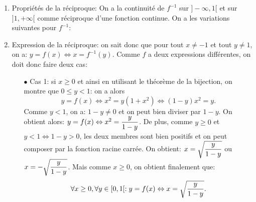 \documentclass[a4paper, 11pt,reqno]{article}
\begin{document}
\begin{correction}
\begin{enumerate}
\begin{itemize}
\begin{itemize}
				            \item[$\star$] $\lim\limits_{x\to +\infty} f(x)=1$ et $\lim\limits_{x\to -1^+} f(x)=-\infty$.
			            \end{itemize}
			            Ainsi d'apr\`{e}s le th\'eor\`{e}me de la bijection, la fonction $f$ est bijective de $\rbrack -1,+\infty\lbrack$ dans $\rbrack -\infty,1\lbrack$.
			      \item[$\bullet$] Ainsi la fonction $f$ est bijective de $\R\setminus\lbrace -1\rbrace$ dans $\R\setminus\lbrace 1\rbrace$.
		      \end{itemize}
		\item Propri\'et\'es de la r\'eciproque: On a la continuit\'e de $f^{-1}$ sur $\rbrack -\infty,1\lbrack$ et sur $\rbrack 1,+\infty\lbrack$ comme r\'eciproque d'une fonction continue. On a les variations suivantes pour $f^{-1}$:
		      \begin{center}
		      \end{center}
		\item Expression de la r\'eciproque: on sait donc que pour tout $x\not= -1$ et tout $y\not= 1$, on a: $y=f(x)\Leftrightarrow x=f^{-1}(y)$. Comme $f$ a deux expressions diff\'erentes, on doit donc faire deux cas:
		      \begin{itemize}
			      \item[$\bullet$] Cas 1: si $x\geq 0$ et ainsi en utilisant le th\'eor\`{e}me de la bijection, on montre que $0\leq y<1$: on a alors
			            $$y=f(x)\Leftrightarrow x^2=y(1+x^2)\Leftrightarrow (1-y)x^2=y.$$
			            Comme $y<1$, on a: $1-y\not= 0$ et on peut bien diviser par $1-y$. On obtient alors: $y=f(x)\Leftrightarrow x^2=\displaystyle\frac{y}{1-y}$. De plus, comme $y\geq 0$ et $y<1\Leftrightarrow 1-y>0$, les deux membres sont bien positifs et on peut composer par la fonction racine carr\'ee. On obtient: $x=\displaystyle\sqrt{\frac{y}{1-y}}$ ou $x=-\displaystyle\sqrt{\frac{y}{1-y}}$. Mais comme $x\geq 0$, on obtient finalement que:
			            $$\forall x\geq 0,\forall y\in\lbrack 0,1\lbrack: y=f(x)\Leftrightarrow x=\displaystyle\sqrt{\frac{y}{1-y}}.$$

\end{itemize}
\end{enumerate}
\end{correction}
\end{document}
